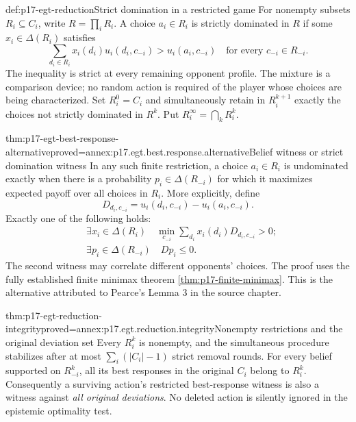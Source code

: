 \begin{hbdefinition}{def:p17-egt-reduction}{Strict domination in a restricted game}
For nonempty subsets \(R_i\subseteq C_i\), write \(R=\prod_iR_i\).
A choice \(a_i\in R_i\) is strictly dominated in \(R\) if some
\(x_i\in\Delta(R_i)\) satisfies
\[
 \sum_{d_i\in R_i}x_i(d_i)u_i(d_i,c_{-i})
                 >u_i(a_i,c_{-i})
                 \quad\text{for every }c_{-i}\in R_{-i}.
\]
The inequality is strict at every remaining opponent profile.
The mixture is a comparison device; no random action is required
of the player whose choices are being characterized.
Set \(R_i^0=C_i\) and simultaneously retain in \(R_i^{k+1}\)
exactly the choices not strictly dominated in \(R^k\).
Put \(R_i^\infty=\bigcap_kR_i^k\).
\end{hbdefinition}

\begin{hblemma}{thm:p17-egt-best-response-alternative}{proved=annex:p17.egt.best.response.alternative}{Belief witness or strict domination witness}
In any such finite restriction, a choice \(a_i\in R_i\) is
undominated exactly when there is a probability
\(p_i\in\Delta(R_{-i})\) for which it maximizes expected payoff
over all choices in \(R_i\).
More explicitly, define
\[
 D_{d_i,c_{-i}}=u_i(d_i,c_{-i})-u_i(a_i,c_{-i}).
\]
Exactly one of the following holds:
\[
\begin{aligned}
 &\exists x_i\in\Delta(R_i)\quad
       \min_{c_{-i}}\sum_{d_i}x_i(d_i)D_{d_i,c_{-i}}>0;\\
 &\exists p_i\in\Delta(R_{-i})\quad Dp_i\leq0 .
\end{aligned}
\]
The second witness may correlate different opponents' choices.
The proof uses the fully established finite minimax theorem
\cref{thm:p17-finite-minimax}. This is the alternative attributed
to Pearce's Lemma 3 in the source chapter.
\end{hblemma}

\begin{hbtheorem}{thm:p17-egt-reduction-integrity}{proved=annex:p17.egt.reduction.integrity}{Nonempty restrictions and the original deviation set}
Every \(R_i^k\) is nonempty, and the simultaneous procedure stabilizes
after at most \(\sum_i(|C_i|-1)\) strict removal rounds.
For every belief supported on \(R_{-i}^k\), all its best responses
in the original \(C_i\) belong to \(R_i^k\).
Consequently a surviving action's restricted best-response witness
is also a witness against \emph{all original deviations}.
No deleted action is silently ignored in the epistemic optimality test.
\end{hbtheorem}

